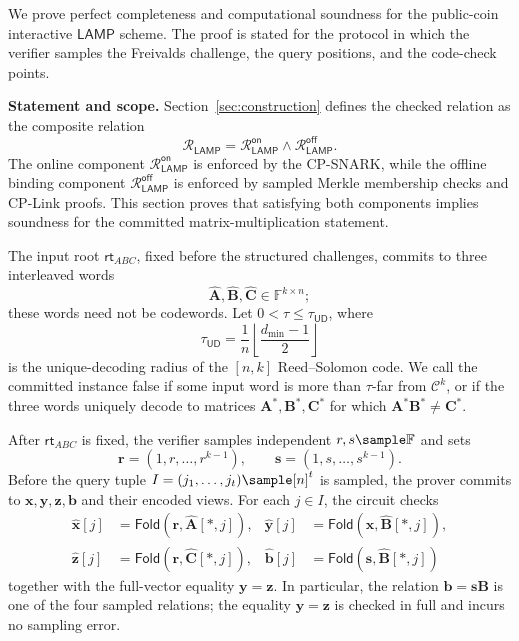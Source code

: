 \documentclass[conference,compsoc]{IEEEtran}
\newif\ifshowrevisions
\newenvironment{revblock}[1][]
  {%
    \ifshowrevisions
      \begin{tcolorbox}[
        breakable,
        colback=revisionyellow,
        colframe=revisionyellow,
        boxrule=0pt,
        arc=0pt,
        left=2pt,
        right=2pt,
        top=2pt,
        bottom=2pt,
        before skip=2pt,
        after skip=2pt,
        #1
      ]
    \fi
  }
  {%
    \ifshowrevisions
      \end{tcolorbox}
    \fi
  }
\newcommand{\rt}{\textsf{rt}}
\newcommand{\mat}{\mathbf}          %
\newcommand{\vect}{\mathbf}         %
\newcommand{\fold}{\textsf{Fold}}
\newcommand{\protocol}{\textsf{LAMP}}   %
\theoremstyle{plain}
\theoremstyle{definition}
\theoremstyle{remark}
\begin{document}
\begin{revblock}
We prove perfect completeness and computational soundness for the public-coin
interactive \(\protocol\) scheme.  The proof is stated for the protocol in which
the verifier samples the Freivalds challenge, the query positions, and the
code-check points.

\noindent\textbf{Statement and scope.}
Section~\ref{sec:construction} defines the checked relation as the composite
relation
\[
  \mathcal{R}_{\mathsf{LAMP}}
  =
  \mathcal{R}_{\mathsf{LAMP}}^{\mathsf{on}}
  \land
  \mathcal{R}_{\mathsf{LAMP}}^{\mathsf{off}}.
\]
The online component
\(\mathcal{R}_{\mathsf{LAMP}}^{\mathsf{on}}\) is enforced by the CP-SNARK,
while the offline binding component
\(\mathcal{R}_{\mathsf{LAMP}}^{\mathsf{off}}\) is enforced by sampled Merkle
membership checks and CP-Link proofs.  This section proves that satisfying both
components implies soundness for the committed matrix-multiplication statement.

The input root \(\rt_{ABC}\), fixed before the structured challenges, commits
to three interleaved words
\[
  \widehat{\mat A},\widehat{\mat B},\widehat{\mat C}
  \in\mathbb F^{k\times n};
\]
these words need not be codewords.  Let \(0<\tau\le\tau_{\mathsf{UD}}\), where
\[
  \tau_{\mathsf{UD}}
  =\frac{1}{n}\left\lfloor\frac{d_{\min}-1}{2}\right\rfloor
\]
is the unique-decoding radius of the \([n,k]\) Reed--Solomon code.  We call the
committed instance false if some input word is more than \(\tau\)-far from
\(\mathcal C^k\), or if the three words uniquely decode to matrices
\(\mat A^*,\mat B^*,\mat C^*\) for which
\(\mat A^*\mat B^*\ne\mat C^*\).

After \(\rt_{ABC}\) is fixed, the verifier samples independent
\(r,s\sample\mathbb F\) and sets
\[
  \vect r=(1,r,\ldots,r^{k-1}),\qquad
  \vect s=(1,s,\ldots,s^{k-1}).
\]
Before the query tuple \(I=(j_1,\ldots,j_t)\sample[n]^t\) is sampled, the
prover commits to \(\vect x,\vect y,\vect z,\vect b\) and their encoded views.
For each \(j\in I\), the circuit checks
\[
\begin{aligned}
 \widehat{\vect x}[j]&=\fold(\vect r,\widehat{\mat A}[*,j]),&
 \widehat{\vect y}[j]&=\fold(\vect x,\widehat{\mat B}[*,j]),\\
 \widehat{\vect z}[j]&=\fold(\vect r,\widehat{\mat C}[*,j]),&
 \widehat{\vect b}[j]&=\fold(\vect s,\widehat{\mat B}[*,j])
\end{aligned}
\]
together with the full-vector equality \(\vect y=\vect z\).  In particular,
the relation \(\vect b=\vect s\mat B\) is one of the four sampled relations;
the equality \(\vect y=\vect z\) is checked in full and incurs no sampling
error.


\end{revblock}
\end{document}
